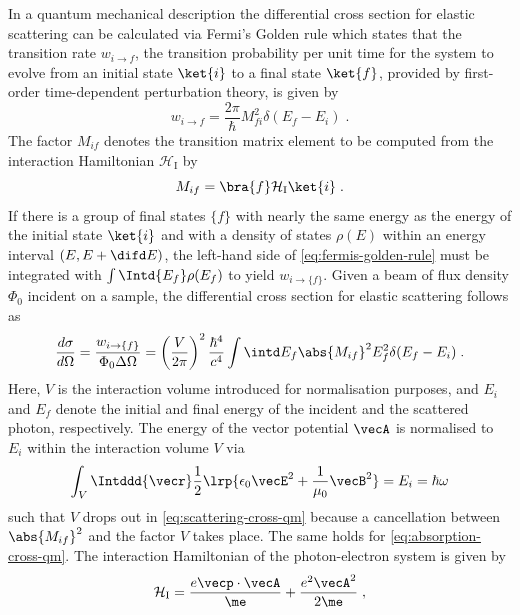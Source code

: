 \documentclass[
twoside,
openright,
titlepage,
numbers=noenddot,
headinclude,
fleqn,
a4paper,
footinclude=true,
cleardoublepage=empty,
abstractoff,
BCOR=5mm,
paper=a4,
fontsize=11pt,
british,ngerman,american,
]{scrreprt}
\begin{document}
In a quantum mechanical description the differential cross section for
elastic scattering can be calculated via Fermi's Golden rule which
states that the transition rate $w_{i\rightarrow f}$, \ie{} the
transition probability per unit time for the system to evolve from an
initial state $\ket{i}$ to a final state $\ket{f}$, provided by
first-order time-dependent perturbation theory, is given by
\cite{Sakurai}
\begin{equation}
  \label{eq:fermis-golden-rule}
  w_{i\rightarrow f}=\frac{2\pi}{\hbar}M_{f i}^2\delta(E_f-E_i)\;.
\end{equation}
The factor $M_{if}$ denotes the transition matrix element to be
computed from the interaction Hamiltonian $\mathcal{H}_{\mathrm{I}}$
by
\begin{equation}
  \label{eq:Mfi}
  M_{if}=\bra{f}\mathcal{H}_{\mathrm{I}}\ket{i} \;.
\end{equation}
If there is a group of final states $\{f\}$ with nearly the same
energy as the energy of the initial state $\ket{i}$ and with a density
of states $\rho(E)$ within an energy interval $(E,E+\difd E)$, the
left-hand side of \cref{eq:fermis-golden-rule} must be integrated with
$\int\Intd{E_f}\rho(E_f)$ to yield $w_{i\to\{f\}}$.  Given a beam of
flux density $\Phi_0$ incident on a sample, the differential cross
section for elastic scattering follows as
\begin{equation}
  \label{eq:scattering-cross-qm}
  \frac{d\sigma}{d\Omega} = 
  \frac{w_{i\to \{f\}}}{\Phi_0\Delta\Omega} = 
  \left(\frac{V}{2\pi}\right)^2\frac{\hbar^4}{c^4}
  \int\intd E_f \abs{M_{if}}^2E_f^2\delta(E_f-E_i)\;.
\end{equation}
Here, $V$ is the interaction volume introduced for normalisation
purposes, and $E_i$ and $E_f$ denote the initial and final energy of
the incident and the scattered photon, respectively.
The energy of the vector potential $\vecA$ is normalised to $E_i$
within the interaction volume $V$ via
\begin{equation}
  \label{eq:normalisation-condition}
  \int_V\Intddd{\vecr}\frac12
  \lrp{\epsilon_0\vecE^2+\frac{1}{\mu_0}\vecB^2} 
  = E_i = \hbar\omega
\end{equation}
such that $V$ drops out in
\cref{eq:scattering-cross-qm} because a cancellation between
$\abs{M_{if}}^2$ and the factor $V$ takes place.  The same holds for
\cref{eq:absorption-cross-qm}.  The interaction Hamiltonian of the
photon-electron system is given by
\begin{equation}
  \label{eq:hamiltonian-vector}
   \mathcal{H}_{\mathrm{I}} = 
   \frac{e \vecp\cdot\vecA}{\me}+\frac{e^2\vecA^2}{2\me} \;,
\end{equation}
\end{document}
